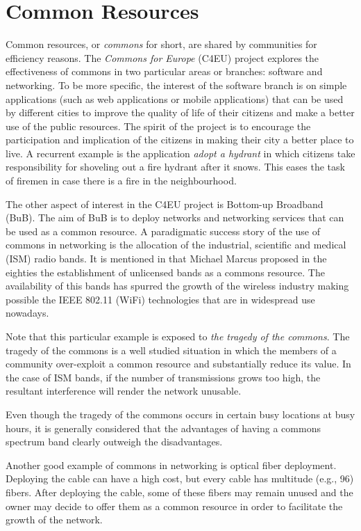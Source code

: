 \documentclass[conference]{IEEEtran}
\begin{document}
\section{Common Resources}
\label{sec:commons}
Common resources, or \emph{commons} for short, are shared by communities for efficiency reasons.
The \emph{Commons for Europe} (C4EU) project explores the effectiveness of commons in two particular areas or branches: software and networking.
To be more specific, the interest of the software branch is on simple applications (such as web applications or mobile applications) that can be used by different cities to improve the quality of life of their citizens and make a better use of the public resources.
The spirit of the project is to encourage the participation and implication of the citizens in making their city a better place to live.
A recurrent example is the application \emph{adopt a hydrant} in which citizens take responsibility for shoveling out a fire hydrant after it snows.
This eases the task of firemen in case there is a fire in the neighbourhood.

The other aspect of interest in the C4EU project is Bottom-up Broadband (BuB).
The aim of BuB is to deploy networks and networking services that can be used as a common resource.
A paradigmatic success story of the use of commons in networking is the allocation of the industrial, scientific and medical (ISM) radio bands.
It is mentioned in \cite{abramson2009asw} that Michael Marcus proposed in the eighties the establishment of unlicensed bands as a commons resource.
The availability of this bands has spurred the growth of the wireless industry making possible the IEEE 802.11 (WiFi) technologies that are in widespread use nowadays.

Note that this particular example is exposed to \emph{the tragedy of the commons}.
The tragedy of the commons is a well studied situation in which the members of a community over-exploit a common resource and substantially reduce its value.
In the case of ISM bands, if the number of transmissions grows too high, the resultant interference will render the network unusable.

Even though the tragedy of the commons occurs in certain busy locations at busy hours, it is generally considered that the advantages of having a commons spectrum band clearly outweigh the disadvantages.

Another good example of commons in networking is optical fiber deployment.
Deploying the cable can have a high cost, but every cable has multitude (e.g., 96) fibers.
After deploying the cable, some of these fibers may remain unused and the owner may decide to offer them as a common resource in order to facilitate the growth of the network.
\end{document}
